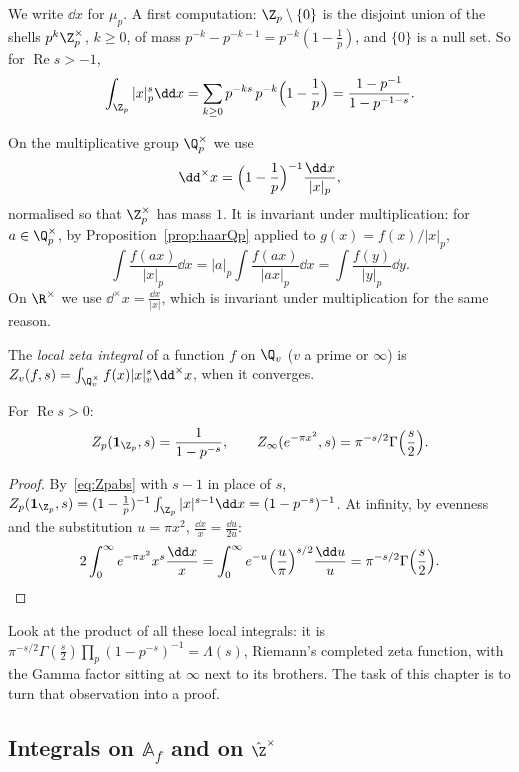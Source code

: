 We write $\dd x$ for $\mu_p$. A first computation: $\Z_p\setminus\{0\}$ is the disjoint union of the shells $p^k\Z_p^\times$, $k\ge0$,
of mass $p^{-k}-p^{-k-1}=p^{-k}(1-\frac1p)$, and $\{0\}$ is a null set. So for $\operatorname{Re}s>-1$,
\begin{equation}\label{eq:Zpabs}
\int_{\Z_p}|x|_p^s\dd x=\sum_{k\ge0}p^{-ks}\,p^{-k}\Bigl(1-\frac1p\Bigr)=\frac{1-p^{-1}}{1-p^{-1-s}}.
\end{equation}

On the multiplicative group $\Q_p^\times$ we use
\[
\dd^\times x=\Bigl(1-\frac1p\Bigr)^{-1}\frac{\dd x}{|x|_p},
\]
normalised so that $\Z_p^\times$ has mass $1$. It is invariant under multiplication: for $a\in\Q_p^\times$, by
Proposition~\ref{prop:haarQp} applied to $g(x)=f(x)/|x|_p$,
\[
\int\frac{f(ax)}{|x|_p}\dd x=|a|_p\int\frac{f(ax)}{|ax|_p}\dd x=\int\frac{f(y)}{|y|_p}\dd y.
\]
On $\R^\times$ we use $\dd^\times x=\frac{\dd x}{|x|}$, which is invariant under multiplication for the same reason.

\begin{definition}
The \emph{local zeta integral} of a function $f$ on $\Q_v$ ($v$ a prime or $\infty$) is
$Z_v(f,s)=\int_{\Q_v^\times}f(x)|x|_v^s\dd^\times x$, when it converges.
\end{definition}

\begin{proposition}\label{prop:localzeta}
For $\operatorname{Re}s>0$:
\[
Z_p(\mathbf 1_{\Z_p},s)=\frac1{1-p^{-s}},\qquad Z_\infty(e^{-\pi x^2},s)=\pi^{-s/2}\Gamma\Bigl(\frac s2\Bigr).
\]
\end{proposition}
\begin{proof}
By~\eqref{eq:Zpabs} with $s-1$ in place of $s$, $Z_p(\mathbf 1_{\Z_p},s)=(1-\frac1p)^{-1}\int_{\Z_p}|x|^{s-1}\dd x=(1-p^{-s})^{-1}$. At
infinity, by evenness and the substitution $u=\pi x^2$, $\frac{\dd x}x=\frac{\dd u}{2u}$:
\[
2\int_0^\infty e^{-\pi x^2}x^s\frac{\dd x}x=\int_0^\infty e^{-u}\Bigl(\frac u\pi\Bigr)^{s/2}\frac{\dd u}u=\pi^{-s/2}\Gamma\Bigl(\frac s2\Bigr).
\]
\end{proof}

Look at the product of all these local integrals: it is $\pi^{-s/2}\Gamma(\frac s2)\prod_p(1-p^{-s})^{-1}=\Lambda(s)$, Riemann's completed
zeta function, with the Gamma factor sitting at $\infty$ next to its brothers. The task of this chapter is to turn that observation
into a proof.

\subsection*{Integrals on \texorpdfstring{$\mathbb{A}_f$}{A\_f} and on \texorpdfstring{$\hat{\Z}^\times$}{Z-hat-times}}

